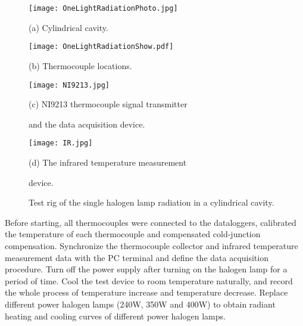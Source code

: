 \begin{figure}
  \begin{minipage}[t]{0.5\linewidth} %
  \nonumber
    \centering
    \texttt{[image: OneLightRadiationPhoto.jpg]}
    \centerline{(a) Cylindrical cavity.}
    \label{Fig:OneLightRadiationShow}
  \end{minipage}%
  \begin{minipage}[t]{0.5\linewidth}
    \centering
    \texttt{[image: OneLightRadiationShow.pdf]}
    \centerline{(b) Thermocouple locations.}
    \label{Fig:OneLightRadiationPhoto}
  \end{minipage}

  \begin{minipage}[t]{0.5\linewidth} %
  \nonumber
    \centering
    \texttt{[image: NI9213.jpg]}
    \centerline{(c) NI9213 thermocouple signal transmitter }
    \centerline{and the data acquisition device. }
    \label{Fig:NI9213}
  \end{minipage}%
  \begin{minipage}[t]{0.5\linewidth}
    \centering
    \texttt{[image: IR.jpg]}
    \centerline{(d) The infrared temperature measurement }
    \centerline{device.}
    \label{Fig:IR}
  \end{minipage}


  \caption{Test rig of the single halogen lamp radiation in a cylindrical cavity.}
  \label{Fig:OneLightRadiation}
\end{figure}

Before starting, all thermocouples were connected to the dataloggers, calibrated the temperature of each thermocouple and compensated cold-junction compensation.
Synchronize the thermocouple collector and infrared temperature measurement data with the PC terminal and define the data acquisition procedure.
Turn off the power supply after turning on the halogen lamp for a period of time. Cool the test device to room temperature naturally, and record the whole process of temperature increase and temperature decrease.
Replace different power halogen lamps (240W, 350W and 400W) to obtain radiant heating and cooling curves of different power halogen lamps.

